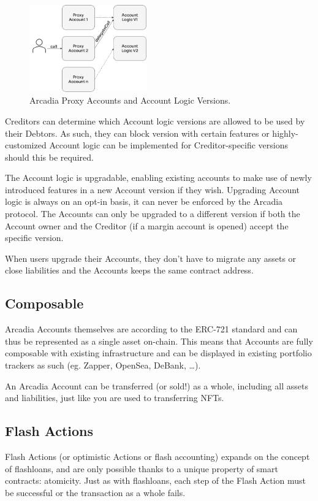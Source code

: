 \documentclass[sigconf,nonacm]{acmart}
\begin{document}
\begin{figure}
    \centering
    \includegraphics[width=0.45\textwidth]{images/Proxy-Accounts.png}
    \caption{Arcadia Proxy Accounts and Account Logic Versions. \label{fig:proxy-accounts}}
\end{figure}

Creditors can determine which Account logic versions are allowed to be used by their Debtors.
As such, they can block version with certain features or highly-customized Account logic can be implemented for Creditor-specific versions should this be required.

The Account logic is upgradable, enabling existing accounts to make use of newly introduced features in a new Account version if they wish.
Upgrading Account logic is always on an opt-in basis, it can never be enforced by the Arcadia protocol.
The Accounts can only be upgraded to a different version if both the Account owner and the Creditor (if a margin account is opened) accept the specific version.

When users upgrade their Accounts, they don't have to migrate any assets or close liabilities and the Accounts keeps the same contract address.

\subsection{Composable}
Arcadia Accounts themselves are according to the ERC-721 standard and can thus be represented as a single asset on-chain.
This means that Accounts are fully composable with existing infrastructure and can be displayed in existing portfolio trackers as such (eg. Zapper, OpenSea, DeBank, …).

An Arcadia Account can be transferred (or sold!) as a whole, including all assets and liabilities, just like you are used to transferring NFTs.

\subsection{Flash Actions}
Flash Actions (or optimistic Actions or flash accounting) expands on the concept of flashloans, and are only possible thanks to a unique property of smart contracts: atomicity\cite{xie2022towards}.
Just as with flashloans, each step of the Flash Action must be successful or the transaction as a whole fails.
\end{document}
